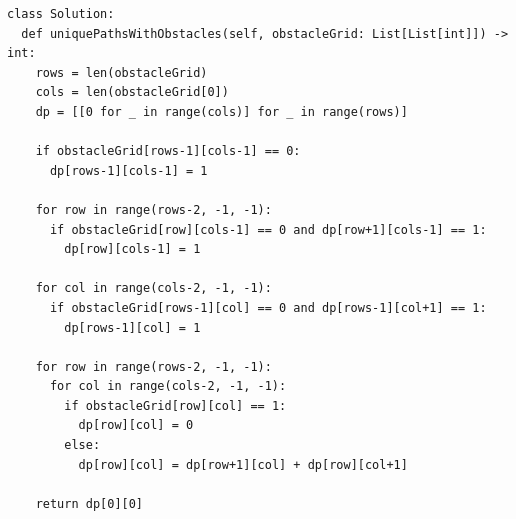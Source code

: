\begin{verbatim}
class Solution:
  def uniquePathsWithObstacles(self, obstacleGrid: List[List[int]]) -> int:
    rows = len(obstacleGrid)
    cols = len(obstacleGrid[0])
    dp = [[0 for _ in range(cols)] for _ in range(rows)]

    if obstacleGrid[rows-1][cols-1] == 0:
      dp[rows-1][cols-1] = 1

    for row in range(rows-2, -1, -1):
      if obstacleGrid[row][cols-1] == 0 and dp[row+1][cols-1] == 1:
        dp[row][cols-1] = 1

    for col in range(cols-2, -1, -1):
      if obstacleGrid[rows-1][col] == 0 and dp[rows-1][col+1] == 1:
        dp[rows-1][col] = 1

    for row in range(rows-2, -1, -1):
      for col in range(cols-2, -1, -1):
        if obstacleGrid[row][col] == 1:
          dp[row][col] = 0
        else:
          dp[row][col] = dp[row+1][col] + dp[row][col+1]

    return dp[0][0]
\end{verbatim}
